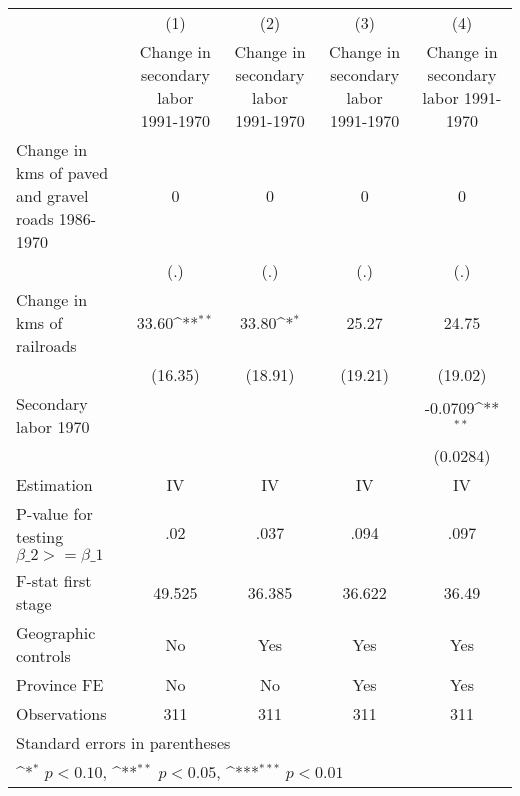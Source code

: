{
\def\sym#1{\ifmmode^{#1}\else\(^{#1}\)\fi}
\begin{tabular}{l*{4}{c}}
\hline\hline
                    &\multicolumn{1}{c}{(1)}&\multicolumn{1}{c}{(2)}&\multicolumn{1}{c}{(3)}&\multicolumn{1}{c}{(4)}\\
                    &\multicolumn{1}{c}{Change in secondary labor 1991-1970}&\multicolumn{1}{c}{Change in secondary labor 1991-1970}&\multicolumn{1}{c}{Change in secondary labor 1991-1970}&\multicolumn{1}{c}{Change in secondary labor 1991-1970}\\
\hline
Change in kms of paved and gravel roads 1986-1970&           0         &           0         &           0         &           0         \\
                    &         (.)         &         (.)         &         (.)         &         (.)         \\
[1em]
Change in kms of railroads&       33.60\sym{**} &       33.80\sym{*}  &       25.27         &       24.75         \\
                    &     (16.35)         &     (18.91)         &     (19.21)         &     (19.02)         \\
[1em]
Secondary labor 1970&                     &                     &                     &     -0.0709\sym{**} \\
                    &                     &                     &                     &    (0.0284)         \\
\hline
Estimation          &          IV         &          IV         &          IV         &          IV         \\
P-value for testing $\beta\_2 >= \beta\_1$&         .02         &        .037         &        .094         &        .097         \\
F-stat first stage  &      49.525         &      36.385         &      36.622         &       36.49         \\
Geographic controls &          No         &         Yes         &         Yes         &         Yes         \\
Province FE         &          No         &          No         &         Yes         &         Yes         \\
Observations        &         311         &         311         &         311         &         311         \\
\hline\hline
\multicolumn{5}{l}{\footnotesize Standard errors in parentheses}\\
\multicolumn{5}{l}{\footnotesize \sym{*} \(p<0.10\), \sym{**} \(p<0.05\), \sym{***} \(p<0.01\)}\\
\end{tabular}
}
